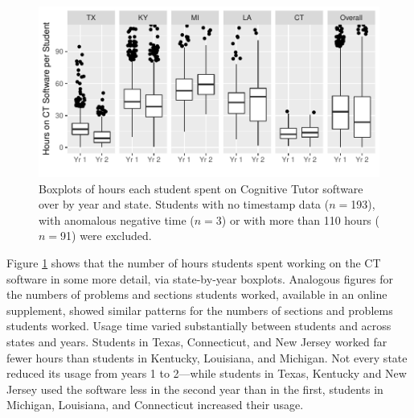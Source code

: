 \documentclass[12pt]{article}\usepackage[]{graphicx}\usepackage[]{color}
\makeatletter
\def\maxwidth{ %
  \ifdim\Gin@nat@width>\linewidth
    \linewidth
  \else
    \Gin@nat@width
  \fi
}
\makeatother
\begin{document}
\begin{figure}
\centering

\includegraphics[width=\maxwidth]{figure/usageTime-1} 

\caption{Boxplots of hours each student spent on Cognitive Tutor
  software over by year and state. Students  with no timestamp data
  ($n=$193), with anomalous negative time
  ($n=$3) or with more than 110 hours ($n=$91)
  were excluded.}
\label{fig:timeByStud}
\end{figure}






Figure \ref{fig:timeByStud} shows that the number of hours students
spent working on the CT software in some more detail, via
state-by-year boxplots.
Analogous figures for the numbers of problems and sections students
worked, available in an online supplement, showed similar patterns for
the numbers of sections and problems students worked.
Usage time varied substantially between students and across states and
years.
Students in Texas,
Connecticut, and New Jersey worked far fewer hours than students in
Kentucky, Louisiana, and Michigan.
Not every state reduced its usage from years 1 to 2---while students
in Texas, Kentucky and New Jersey used the software less in the second
year than in the first, students in Michigan, Louisiana, and
Connecticut increased their usage.
\end{document}
